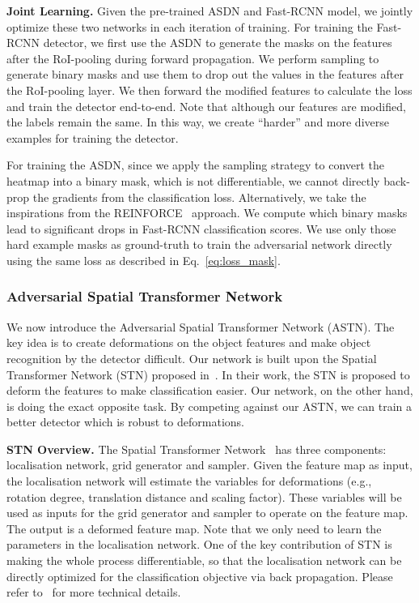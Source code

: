 \textbf{Joint Learning.}  Given the pre-trained ASDN and Fast-RCNN model, we jointly optimize these two networks in each iteration of training. For training the Fast-RCNN detector, we first use the ASDN to generate the masks on the features after the RoI-pooling during forward propagation. We perform sampling to generate binary masks and use them to drop out the values in the features after the RoI-pooling layer. We then forward the modified features to calculate the loss and train the detector end-to-end. Note that although our features are modified, the labels remain the same. In this way, we create ``harder'' and more diverse examples for training the detector. 

For training the ASDN, since we apply the sampling strategy to convert the heatmap into a binary mask, which is not differentiable, we cannot directly back-prop the gradients from the classification loss. Alternatively, we take the inspirations  from the REINFORCE~\cite{reinforce} approach. We compute  which binary masks lead to significant drops in Fast-RCNN classification scores. We use only those hard example masks as ground-truth to train the adversarial network directly using the same loss as described in Eq.~\ref{eq:loss_mask}.




\vspace{-0.05in}
\subsubsection{Adversarial Spatial Transformer Network}
\vspace{-0.05in}
We now introduce the Adversarial Spatial Transformer Network (ASTN). The key idea is to create deformations on the object features and make object recognition by the detector difficult. Our network is built upon the Spatial Transformer Network (STN) proposed in~\cite{stn15}. In their work, the STN is proposed to deform the features to make classification easier. Our network, on the other hand, is doing the exact opposite task. By competing against our ASTN, we can train a better detector which is robust to deformations. 

\textbf{STN Overview.} The Spatial Transformer Network~\cite{stn15} has three components: localisation network, grid generator and sampler. Given the feature map as input, the localisation network will estimate the variables for deformations (e.g., rotation degree, translation distance and scaling factor). These variables will be used as inputs for the grid generator and sampler to operate on the feature map. The output is a deformed feature map. Note that we only need to learn the parameters in the localisation network. One of the key contribution of STN is making the whole process differentiable, so that the localisation network can be directly optimized for the classification objective via back propagation. Please refer to~\cite{stn15} for more technical details. 



